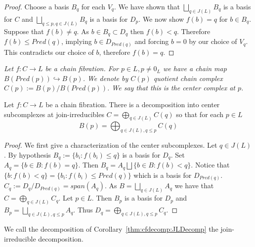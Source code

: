 \begin{proof}
Choose a basis $B_q$ for each $V_q$.  We have shown that $\bigsqcup_{q\in J(L)} B_q$ is a basis for $C$ and $\bigsqcup_{q\leq p, q\in J(L)} B_q$ is a basis for $D_p$.   We now show $f(b)=q$ for $b\in B_q$. Suppose that $f(b)\neq q$.  As $b\in B_q\subset D_q$ then $f(b)< q$.  Therefore $f(b)\leq Pred(q)$, implying $b\in D_{Pred(q)}$ and forcing $b=0$ by our choice of $V_q$.  This contradicts our choice of $b$, therefore $f(b)=q$. 

\end{proof}





 
\begin{defn}
{\em
Let $f:C\to L$ be a chain fibration. For $p\in L, p\neq 0_L$ we have a chain map $B(Pred(p))\hookrightarrow B(p)$.   We denote by $C(p)$ quotient chain complex $C(p):= B(p)/B(Pred(p))$.  We say that this is the {\em center complex at $p$}.
}
\end{defn}
 
 
 
 \begin{cor}\label{thm:cfdecomp:JLDecomp}
 Let $f:C\to L$ be a chain fibration.  There is a decomposition into center subcomplexes at join-irreducibles $C= \bigoplus_{q\in J(L)} C(q)$ so that for each $p\in L$ $$B(p)= \bigoplus_{q\in J(L), q\leq p} C(q)$$ 
 \end{cor}
 \begin{proof}
  We first give a characterization of the center subcomplexes.  Let $q\in J(L)$.  By hypothesis $B_q:= \{b_i: f(b_i)\leq q\}$ is a basis for $D_q$.  Set $A_q =  \{b\in B:f(b)=q\}$.  Then $B_q = A_q\bigsqcup \{b\in B:f(b)< q\}$.  Notice that $\{b:f(b)<q\} = \{b_i:f(b_i)\leq Pred(q)\}$ which is a basis for $D_{Pred(q)}$.    $C_q := D_q/ D_{Pred(q)} = span(A_q)$.  As $B = \bigsqcup_{q\in J(L)} A_q$ we have that $C=\bigoplus_{q\in J(L)} C_q$.  Let $p\in L$.  Then $B_p$ is a basis for $D_p$ and $B_p = \bigsqcup_{q\in J(L),q\leq p} A_q$.  Thus $D_q = \bigoplus_{q\in J(L),q\leq p} C_q$.



 \end{proof}

 
 
 We call the decomposition of Corollary~\ref{thm:cfdecomp:JLDecomp} the join-irreducible decomposition.   
 

